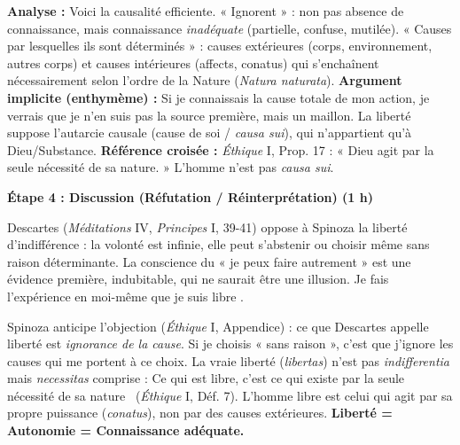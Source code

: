 \documentclass[11pt]{article}
\newcommand{\cle}[1]{{\popxbold\color{popdark}#1}}
\begin{document}
\begin{experience}
\textbf{Analyse :} Voici la \cle{causalité efficiente}. « Ignorent » : non pas absence de connaissance, mais connaissance \emph{inadéquate} (partielle, confuse, mutilée). « Causes par lesquelles ils sont déterminés » : causes extérieures (corps, environnement, autres corps) et causes intérieures (affects, conatus) qui s'enchaînent nécessairement selon l'ordre de la Nature (\emph{Natura naturata}).
\textbf{Argument implicite (enthymème) :} Si je connaissais la cause totale de mon action, je verrais que je n'en suis pas la source première, mais un maillon. La liberté suppose l'autarcie causale (cause de soi / \emph{causa sui}), qui n'appartient qu'à Dieu/Substance.
\textbf{Référence croisée :} \emph{Éthique} I, Prop. 17 : « Dieu agit par la seule nécessité de sa nature. » L'homme n'est pas \emph{causa sui}.
\end{experience}

\textbf{Étape 4 : Discussion (Réfutation / Réinterprétation) (1 h)}\par

\begin{propriete}
Descartes (\emph{Méditations} IV, \emph{Principes} I, 39-41) oppose à Spinoza la \cle{liberté d'indifférence} : la volonté est infinie, elle peut s'abstenir ou choisir même sans raison déterminante. La conscience du « je peux faire autrement » est une évidence première, indubitable, qui ne saurait être une illusion. \guillemotleft Je fais l'expérience en moi-même que je suis libre \guillemotright.
\end{propriete}

\begin{propriete}
Spinoza anticipe l'objection (\emph{Éthique} I, Appendice) : ce que Descartes appelle liberté est \emph{ignorance de la cause}. Si je choisis « sans raison », c'est que j'ignore les causes qui me portent à ce choix. La vraie liberté (\emph{libertas}) n'est pas \emph{indifferentia} mais \emph{necessitas} comprise : \guillemotleft Ce qui est libre, c'est ce qui existe par la seule nécessité de sa nature \guillemotright\ (\emph{Éthique} I, Déf. 7). L'homme libre est celui qui agit par sa propre puissance (\emph{conatus}), non par des causes extérieures. \textbf{Liberté = Autonomie = Connaissance adéquate.}
\end{propriete}
\end{document}
